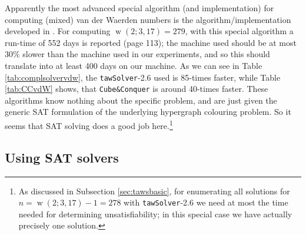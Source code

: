 \documentclass[final,3p,times]{elsarticle}
\theoremstyle{definition}
\newcommand{\tawsolver}{\texttt{tawSolver}}
\newcommand{\ntawsolver}{\tawsolver-2.6}
\newcommand{\cubeconq}{\texttt{Cube\:\&\:Conquer}}
\DeclareMathOperator{\vdw}{w}
\begin{document}
Apparently the most advanced special algorithm (and implementation) for computing (mixed) van der Waerden numbers is the algorithm/implementation developed in \cite{Schweitzer2009Ramsey}. For computing $\vdw(2;3,17) = 279$, with this special algorithm a run-time of 552 days is reported (page 113); the machine used should be at most $30\%$ slower than the machine used in our experiments, and so this should translate into at least 400 days on our machine. As we can see in Table \ref{tab:complsolvervdw}, the \ntawsolver{} used is 85-times faster, while Table \ref{tab:CCvdW} shows, that \cubeconq{} is around 40-times faster. These algorithms know nothing about the specific problem, and are just given the generic SAT formulation of the underlying hypergraph colouring problem. So it seems that SAT solving does a good job here.\footnote{As discussed in Subsection \ref{sec:tawsbasic}, for enumerating all solutions for $n=\vdw(2;3,17)-1 = 278$ with \ntawsolver{} we need at most the time needed for determining unsatisfiability; in this special case we have actually precisely one solution.}



\subsection{Using SAT solvers}
\label{sec:usingsat}
\end{document}
